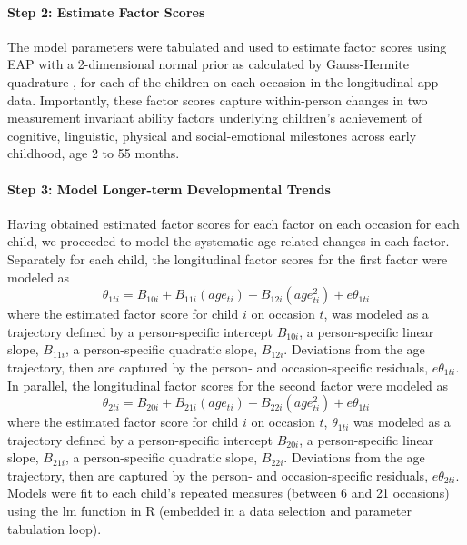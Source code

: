 \documentclass[man, floatsintext]{apa7}
\begin{document}
\paragraph{Step 2: Estimate Factor
Scores}
The model parameters were tabulated and used to estimate factor scores
using EAP with a 2-dimensional normal prior as calculated by
Gauss-Hermite quadrature \parencite{embretson2013}, for each of the children on each occasion
in the longitudinal app data. Importantly, these factor scores capture
within-person changes in two measurement invariant ability factors
underlying children's achievement of cognitive, linguistic, physical and
social-emotional milestones across early childhood, age 2 to 55 months.

\paragraph{Step 3: Model Longer-term Developmental Trends}

Having obtained estimated factor scores for each factor on each occasion
for each child, we proceeded to model the systematic age-related changes
in each factor. Separately for each child, the longitudinal factor
scores for the first factor were modeled as
\begin{equation}
\theta_{1ti} = B_{10i} + B_{11i}(age_{ti}) + B_{12i}(age^2_{ti}) + e\theta_{1ti}
\end{equation}
where the estimated factor score for child $i$ on
occasion $t$, was modeled as a trajectory defined by a person-specific
intercept $B_{10i}$, a person-specific linear slope, $B_{11i}$, a
person-specific quadratic slope, $B_{12i}$. Deviations from the age
trajectory, then are captured by the person- and occasion-specific
residuals, $e\theta_{1ti}$. In parallel, the longitudinal factor
scores for the second factor were modeled as
\begin{equation}
\theta_{2ti} = B_{20i} + B_{21i}(age_{ti}) + B_{22i}(age^2_{ti}) + e\theta_{1ti}
\end{equation} where the estimated factor score for child $i$ on
occasion $t$, $\theta_{1ti}$ was modeled as a trajectory defined by
a person-specific intercept $B_{20i}$, a person-specific linear slope,
$B_{21i}$, a person-specific quadratic slope, $B_{22i}$. Deviations
from the age trajectory, then are captured by the person- and
occasion-specific residuals, $e\theta_{2ti}$. Models were fit to each
child's repeated measures (between 6 and 21 occasions) using the lm
function in R (embedded in a data selection and parameter tabulation
loop).
\end{document}
